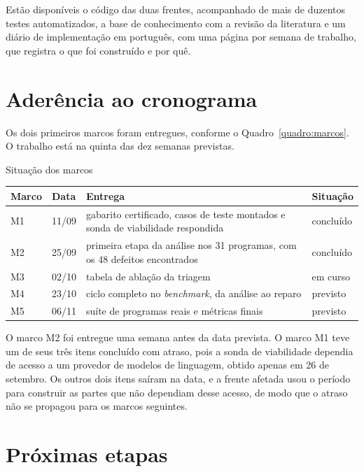 \documentclass[article,12pt,oneside,a4paper,english,brazil]{abntex2}
\begin{document}
Estão disponíveis o código das duas frentes, acompanhado de mais de duzentos
testes automatizados, a base de conhecimento com a revisão da literatura e um
diário de implementação em português, com uma página por semana de trabalho, que
registra o que foi construído e por quê.

\section{Aderência ao cronograma}

Os dois primeiros marcos foram entregues, conforme o Quadro~\ref{quadro:marcos}.
O trabalho está na quinta das dez semanas previstas.

\begin{quadro}[htb]
  \caption{\label{quadro:marcos}Situação dos marcos}
  \small
  \begin{tabular}{|l|l|L{6.8cm}|l|}
    \hline
    Marco & Data & Entrega & Situação \\
    \hline
    M1 & 11/09 & gabarito certificado, casos de teste montados e sonda de viabilidade respondida & concluído \\
    \hline
    M2 & 25/09 & primeira etapa da análise nos 31 programas, com os 48 defeitos encontrados & concluído \\
    \hline
    M3 & 02/10 & tabela de ablação da triagem & em curso \\
    \hline
    M4 & 23/10 & ciclo completo no \textit{benchmark}, da análise ao reparo & previsto \\
    \hline
    M5 & 06/11 & suíte de programas reais e métricas finais & previsto \\
    \hline
  \end{tabular}
\end{quadro}

O marco M2 foi entregue uma semana antes da data prevista. O marco M1 teve um de
seus três itens concluído com atraso, pois a sonda de viabilidade dependia de
acesso a um provedor de modelos de linguagem, obtido apenas em 26 de setembro.
Os outros dois itens saíram na data, e a frente afetada usou o período para
construir as partes que não dependiam desse acesso, de modo que o atraso não se
propagou para os marcos seguintes.

\section{Próximas etapas}
\end{document}
